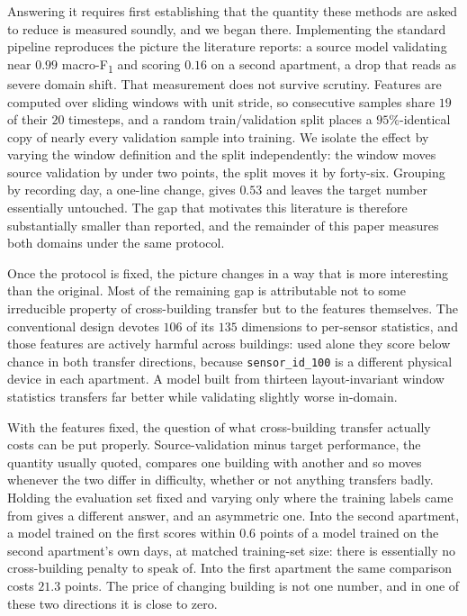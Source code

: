 \documentclass[a4paper,fleqn]{cas-dc}
\newcommand{\macf}{macro-F\textsubscript{1}}
\begin{document}
Answering it requires first establishing that the quantity these methods are asked to
reduce is measured soundly, and we began there. Implementing the standard pipeline
reproduces the picture the literature reports: a source model validating near $0.99$
\macf{} and scoring $0.16$ on a second apartment, a drop that reads as severe domain
shift. That measurement does not survive scrutiny. Features are computed over sliding
windows with unit stride, so consecutive samples share $19$ of their $20$ timesteps, and a
random train/validation split places a $95\%$-identical copy of nearly every validation
sample into training. We isolate the effect by varying the window definition and the split
independently: the window moves source validation by under two points, the split moves it
by forty-six. Grouping by recording day, a one-line change, gives $0.53$ and leaves
the target number essentially untouched. The gap that motivates this literature is
therefore substantially smaller than reported, and the remainder of this paper measures
both domains under the same protocol.

Once the protocol is fixed, the picture changes in a way that is more interesting than
the original. Most of the remaining gap is attributable not to some irreducible property
of cross-building transfer but to the features themselves. The conventional design devotes
$106$ of its $135$ dimensions to per-sensor statistics, and those features are actively
harmful across buildings: used alone they score below chance in both transfer directions,
because \texttt{sensor\_id\_100} is a different physical device in each apartment. A model
built from thirteen layout-invariant window statistics transfers far better while
validating slightly worse in-domain.

With the features fixed, the question of what cross-building transfer actually costs can
be put properly. Source-validation minus target performance, the quantity usually quoted,
compares one building with another and so moves whenever the two differ in difficulty,
whether or not anything transfers badly. Holding the evaluation set fixed and varying only
where the training labels came from gives a different answer, and an asymmetric one. Into
the second apartment, a model trained on the first scores within $0.6$ points of a model
trained on the second apartment's own days, at matched training-set size: there is
essentially no cross-building penalty to speak of. Into the first apartment the same
comparison costs $21.3$ points. The price of changing building is not one number, and in
one of these two directions it is close to zero.
\end{document}
